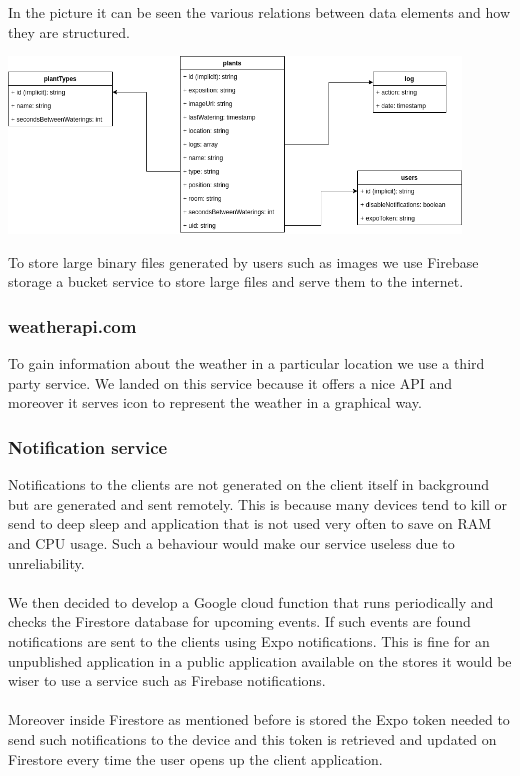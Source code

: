 \documentclass[10pt]{article}
\begin{document}
	In the picture it can be seen the various relations between data elements and how they are structured.
	
	\includegraphics[width=0.9\textwidth]{resources/firestore.png}

	To store large binary files generated by users such as images we use Firebase storage a bucket service to store large files and serve them to the internet.
	
	
	\subsubsection{weatherapi.com}
	To gain information about the weather in a particular location we use a third party service. We landed on this service because it offers a nice API and moreover it serves icon to represent the weather in a graphical way.
	
	\subsubsection{Notification service}
	Notifications to the clients are not generated on the client itself in background but are generated and sent remotely. This is because many devices tend to kill or send to deep sleep and application that is not used very often to save on RAM and CPU usage. Such a behaviour would make our service useless due to unreliability. \\\\ We then decided to develop a Google cloud function that runs periodically and checks the Firestore database for upcoming events. If such events are found notifications are sent to the clients using Expo notifications. This is fine for an unpublished application in a public application available on the stores it would be wiser to use a service such as Firebase notifications.\\\\ Moreover inside Firestore as mentioned before is stored the Expo token needed to send such notifications to the device and this token is retrieved and updated on Firestore every time the user opens up the client application.
	
\end{document}
